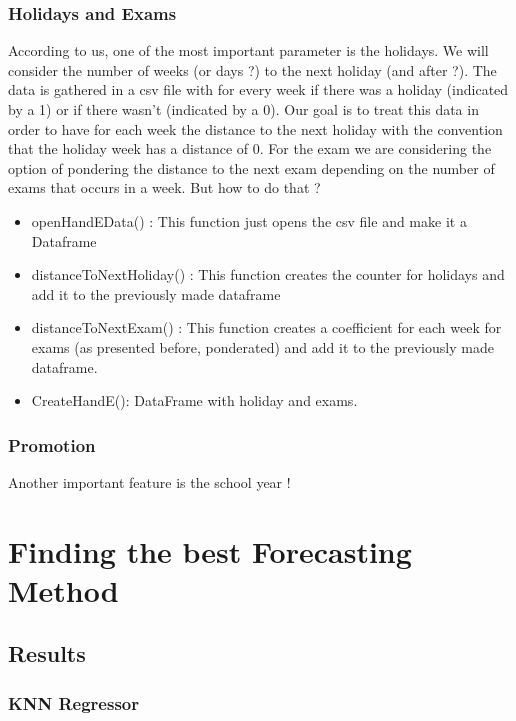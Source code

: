 \documentclass{report}
\begin{document}
\subsection{Holidays and Exams}

According to us, one of the most important parameter is the holidays. We will consider the number of weeks (or days ?) to the next holiday (and after ?). The data is gathered in a csv file with for every week if there was a holiday (indicated by a 1) or if there wasn't (indicated by a 0). Our goal is to treat this data in order to have for each week the distance to the next holiday with the convention that the holiday week has a distance of 0. 
For the exam we are considering the option of pondering the distance to the next exam depending on the number of exams that occurs in a week. But how to do that ?

\begin{itemize}
\item openHandEData() : This function just opens the csv file and make it a Dataframe
\item distanceToNextHoliday() : This function creates the counter for holidays and add it to the previously made dataframe
\item distanceToNextExam() : This function creates a coefficient for each week for exams (as presented before, ponderated) and add it to the previously made dataframe.
\item CreateHandE(): DataFrame with holiday and exams.
\end{itemize}

\subsection{Promotion}
Another important feature is the school year !



\chapter{Finding the best Forecasting Method}

\section{Results}

\subsection{KNN Regressor}
\end{document}
